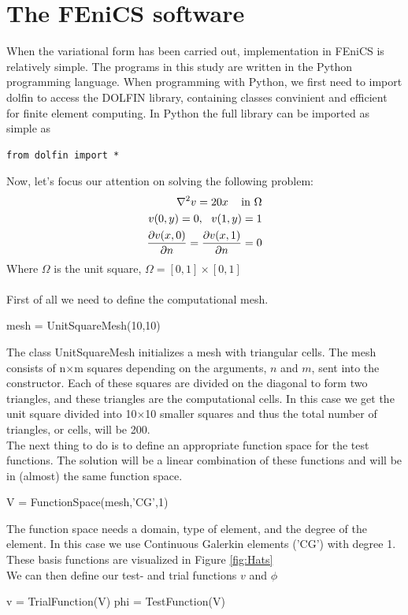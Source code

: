 \section{The FEniCS software} 
When the variational form has been carried out, implementation in FEniCS is relatively simple. The programs in this study are written in the Python programming language. When programming with Python, we first need to import dolfin to access the DOLFIN library, containing classes convinient and efficient for finite element computing. In Python the full library can be imported as simple as 
\begin{verbatim}
from dolfin import *
\end{verbatim}
Now, let's focus our attention on solving the following problem:
\begin{align}
\nabla^2v = 20x \,\,\,\,\, \text{ in } \Omega \\
v(0,y) = 0, \,\,\,\, v(1,y) = 1 \\
\frac{\partial v(x,0)}{\partial n} = \frac{\partial v(x,1)}{\partial n} = 0
\end{align}
Where $\Omega$ is the unit square, $\Omega = [0,1] \times [0,1]$ \\
\\
First of all we need to define the computational mesh.
\begin{cverbatim}
mesh = UnitSquareMesh(10,10)
\end{cverbatim}
The class UnitSquareMesh initializes a mesh with triangular cells. The mesh consists of n$\times$m squares depending on the arguments, $n$ and $m$, sent into the constructor. Each of these squares are divided on the diagonal to form two triangles, and these triangles are the computational cells. In this case we get the unit square divided into 10$\times$10 smaller squares and thus the total number of triangles, or cells, will be 200. \\
The next thing to do is to define an appropriate function space for the test functions. The solution will be a linear combination of these functions and will be in (almost) the same function space. 
\begin{cverbatim}
V = FunctionSpace(mesh,'CG',1)
\end{cverbatim}
The function space needs a domain, type of element, and the degree of the element. In this case we use Continuous Galerkin elements ('CG') with degree 1. These basis functions are visualized in Figure \ref{fig:Hats}
\\ We can then define our test- and trial functions $v$ and $\phi$
\begin{cverbatim}
v = TrialFunction(V)
phi = TestFunction(V)
\end{cverbatim}
